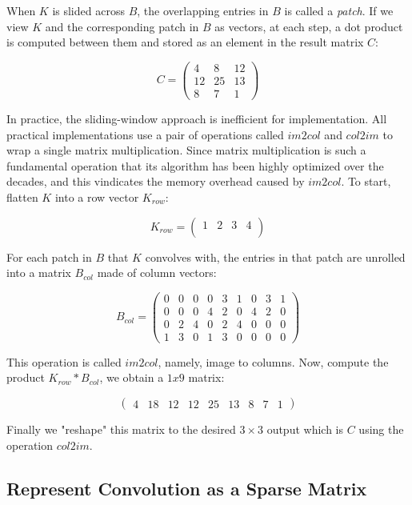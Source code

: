 When $K$ is slided across $B$, the overlapping entries in $B$ is called a \textit{patch}. If we view $K$ and
the corresponding patch in $B$ as vectors, at each step, a dot product is computed between them and stored as
an element in the result matrix $C$:

$$
C =
  \begin{pmatrix}
    4 & 8 & 12 \\
    12 & 25 & 13 \\
    8 & 7 & 1
  \end{pmatrix}
$$

In practice, the sliding-window approach is inefficient for implementation. All practical implementations
use a pair of operations called $im2col$ and $col2im$ to wrap a single matrix multiplication. Since
matrix multiplication is such a fundamental operation that its algorithm has been highly optimized over the
decades, and this vindicates the memory overhead caused by $im2col$. To start, flatten $K$ into a row vector
$K_{row}$:

$$
K_{row} =
  \begin{pmatrix}
    1 & 2 & 3 & 4 \\
  \end{pmatrix}
$$

For each patch in $B$ that $K$ convolves with, the entries in that patch are unrolled into a matrix $B_{col}$
made of column vectors:

$$
B_{col} =
  \begin{pmatrix}
    0 & 0 & 0 & 0 & 3 & 1 & 0 & 3 & 1 \\
    0 & 0 & 0 & 4 & 2 & 0 & 4 & 2 & 0 \\
    0 & 2 & 4 & 0 & 2 & 4 & 0 & 0 & 0 \\
    1 & 3 & 0 & 1 & 3 & 0 & 0 & 0 & 0
  \end{pmatrix}
$$

This operation is called $im2col$, namely, image to columns. Now, compute the product $K_{row} * B_{col}$, we
obtain a $1x9$ matrix:

$$
\begin{pmatrix}
  4 & 18 & 12 & 12 & 25 & 13 & 8 & 7 & 1
\end{pmatrix}
$$

Finally we "reshape" this matrix to the desired $3 \times 3$ output which is $C$ using the operation $col2im$.

\subsection{Represent Convolution as a Sparse Matrix}

